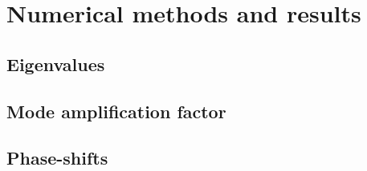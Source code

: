 
\section{Numerical methods and results}
\label{Section2}

\subsection{Eigenvalues}

\subsection{Mode amplification factor}

\subsection{Phase-shifts}

\clearpage